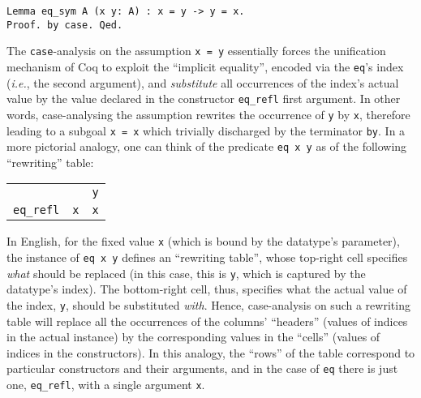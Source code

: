\documentclass[blockstyle,preprint,nocopyrightspace]{sigplanconf}
\newcommand{\code}[1]{\lstinline{#1}}
\newcommand{\ie}{\emph{i.e.}\xspace}
\begin{document}

\begin{lstlisting}
Lemma eq_sym A (x y: A) : x = y -> y = x.
Proof. by case. Qed.
\end{lstlisting}

The \code{case}-analysis on the assumption \code{x = y} essentially
forces the unification mechanism of Coq to exploit the ``implicit
equality'', encoded via the \code{eq}'s index (\ie, the second
argument), and \emph{substitute} all occurrences of the index's actual
value by the value declared in the constructor \code{eq_refl} first
argument. In other words, case-analysing the assumption rewrites the
occurrence of \code{y} by \code{x}, therefore leading to a subgoal
\code{x = x} which trivially discharged by the terminator
\code{by}. In a more pictorial analogy, one can think of the predicate
\code{eq x y} as of the following ``rewriting'' table:

\vspace{5pt}

\begin{center}
\hspace{-20pt}
  \begin{tabular}{r|r|c|}
    \cline{3-3}
    \multicolumn{2}{c|}{} & \code{y}
    \\
    \cline{2-3} 
    \multicolumn{1}{r}{\code{eq_refl}} &\multicolumn{1}{|c||}{\code{x}} & \code{x}
    \\    \cline{2-3}
  \end{tabular}
\end{center}

\vspace{5pt}

In English, for the fixed value \code{x} (which is bound by the
datatype's parameter), the instance of \code{eq x y} defines an
``rewriting table'', whose top-right cell specifies \emph{what} should
be replaced (in this case, this is \code{y}, which is captured by the
datatype's index). The bottom-right cell, thus, specifies what the
actual value of the index, \code{y}, should be substituted
\emph{with}. Hence, case-analysis on such a rewriting table will
replace all the occurrences of the columns' ``headers'' (values of
indices in the actual instance) by the corresponding values in the
``cells'' (values of indices in the constructors). In this analogy,
the ``rows'' of the table correspond to particular constructors and
their arguments, and in the case of \code{eq} there is just one,
\code{eq_refl}, with a single argument \code{x}.
\end{document}
